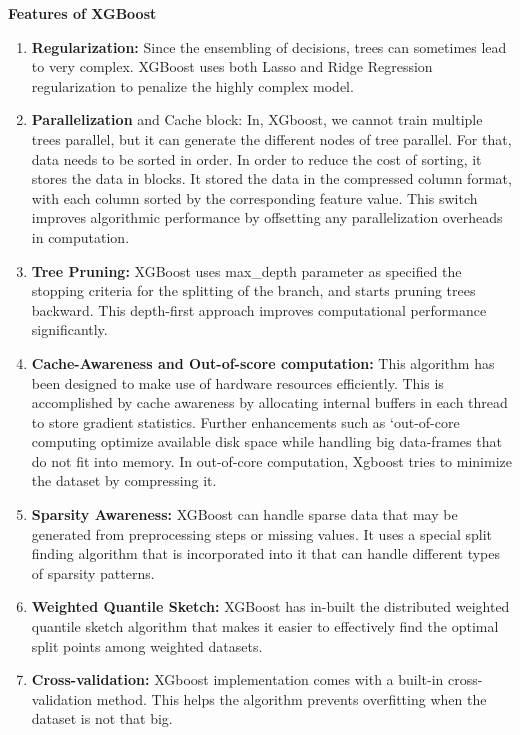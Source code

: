 \documentclass[12pt]{article}
\begin{document}
\textbf{Features of XGBoost}
\begin{enumerate}
\item\textbf{Regularization:} Since the ensembling of decisions, trees can sometimes lead to very complex. XGBoost uses both Lasso and Ridge Regression regularization to penalize the highly complex model.
\item\textbf{Parallelization} and Cache block: In, XGboost, we cannot train multiple trees parallel, but it can generate the different nodes of tree parallel. For that, data needs to be sorted in order. In order to reduce the cost of sorting, it stores the data in blocks. It stored the data in the compressed column format, with each column sorted by the corresponding feature value. This switch improves algorithmic performance by offsetting any parallelization overheads in computation.
\item\textbf{Tree Pruning:}  XGBoost uses max\_depth parameter as specified the stopping criteria for the splitting of the branch, and starts pruning trees backward. This depth-first approach improves computational performance significantly.
\item\textbf{Cache-Awareness and Out-of-score computation:} This algorithm has been designed to make use of hardware resources efficiently. This is accomplished by cache awareness by allocating internal buffers in each thread to store gradient statistics. Further enhancements such as ‘out-of-core computing optimize available disk space while handling big data-frames that do not fit into memory. In out-of-core computation, Xgboost tries to minimize the dataset by compressing it.
\item\textbf{Sparsity Awareness:} XGBoost can handle sparse data that may be generated from preprocessing steps or missing values. It uses a special split finding algorithm that is incorporated into it that can handle different types of sparsity patterns.
\item\textbf{Weighted Quantile Sketch:} XGBoost has in-built the distributed weighted quantile sketch algorithm that makes it easier to effectively find the optimal split points among weighted datasets.
\item\textbf{Cross-validation:} XGboost implementation comes with a built-in cross-validation method. This helps the algorithm prevents overfitting when the dataset is not that big.
\end{enumerate}
\end{document}
